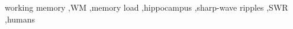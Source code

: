 \documentclass[final,3p,times,twocolumn]{elsarticle}
\begin{document}
\begin{frontmatter}
\begin{abstract}
\end{abstract}%
\begin{keyword}
working memory \sep WM \sep memory load \sep hippocampus \sep sharp-wave ripples \sep SWR \sep humans
\end{keyword}
\end{frontmatter}

\end{document}
